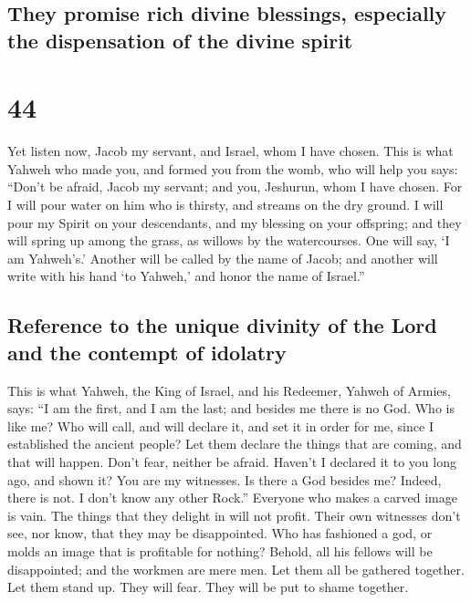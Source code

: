 \hypertarget{they-promise-rich-divine-blessings-especially-the-dispensation-of-the-divine-spirit}{%
\subsection{They promise rich divine blessings, especially the
dispensation of the divine
spirit}\label{they-promise-rich-divine-blessings-especially-the-dispensation-of-the-divine-spirit}}

\hypertarget{section-43}{%
\section{44}\label{section-43}}

 Yet listen now, Jacob my servant, and Israel, whom I have
chosen.  This is what Yahweh who made you, and formed you
from the womb, who will help you says: ``Don't be afraid, Jacob my
servant; and you, Jeshurun, whom I have chosen.  For I
will pour water on him who is thirsty, and streams on the dry ground. I
will pour my Spirit on your descendants, and my blessing on your
offspring;  and they will spring up among the grass, as
willows by the watercourses.  One will say, `I am
Yahweh's.' Another will be called by the name of Jacob; and another will
write with his hand `to Yahweh,' and honor the name of Israel.''

\hypertarget{reference-to-the-unique-divinity-of-the-lord-and-the-contempt-of-idolatry}{%
\subsection{Reference to the unique divinity of the Lord and the
contempt of
idolatry}\label{reference-to-the-unique-divinity-of-the-lord-and-the-contempt-of-idolatry}}

 This is what Yahweh, the King of Israel, and his
Redeemer, Yahweh of Armies, says: ``I am the first, and I am the last;
and besides me there is no God.  Who is like me? Who will
call, and will declare it, and set it in order for me, since I
established the ancient people? Let them declare the things that are
coming, and that will happen.  Don't fear, neither be
afraid. Haven't I declared it to you long ago, and shown it? You are my
witnesses. Is there a God besides me? Indeed, there is not. I don't know
any other Rock.''  Everyone who makes a carved image is
vain. The things that they delight in will not profit. Their own
witnesses don't see, nor know, that they may be disappointed.
 Who has fashioned a god, or molds an image that is
profitable for nothing?  Behold, all his fellows will be
disappointed; and the workmen are mere men. Let them all be gathered
together. Let them stand up. They will fear. They will be put to shame
together.


